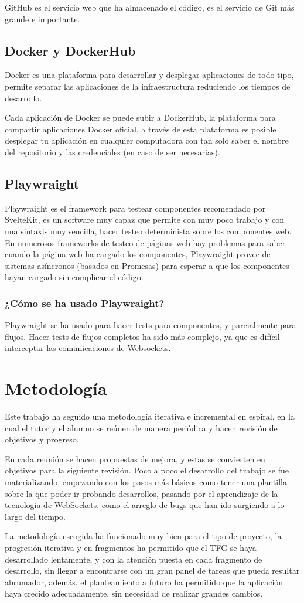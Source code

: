 GitHub es el servicio web que ha almacenado el código, es el servicio de Git más grande e importante.

\subsection{Docker y DockerHub}
Docker es una plataforma para desarrollar y desplegar aplicaciones de todo tipo, permite separar las aplicaciones de la infraestructura reduciendo los tiempos de desarrollo.

Cada aplicación de Docker se puede subir a DockerHub, la plataforma para compartir aplicaciones Docker oficial, a través de esta plataforma es posible desplegar tu aplicación en cualquier computadora con tan solo saber el nombre del repositorio y las credenciales (en caso de ser necesarias).

\subsection{Playwraight}
Playwraight \cite{playwright_docs} es el framework para testear componentes recomendado por SvelteKit, es un software muy capaz que permite con muy poco trabajo y con una sintaxis muy sencilla, hacer testeo determinista sobre los componentes web. En numerosos frameworks de testeo de páginas web hay problemas para saber cuando la página web ha cargado los componentes, Playwraight provee de sistemas asíncronos (basados en Promesas) para esperar a que los componentes hayan cargado sin complicar el código.

\subsubsection{¿Cómo se ha usado Playwraight?}
Playwraight se ha usado para hacer tests para componentes, y parcialmente para flujos. Hacer tests de flujos completos ha sido más complejo, ya que es difícil interceptar las comunicaciones de Websockets.

\section{Metodología}
Este trabajo ha seguido una metodología iterativa e incremental en espiral, en la cual el tutor y el alumno se reúnen de manera periódica y hacen revisión de objetivos y progreso.

En cada reunión se hacen propuestas de mejora, y estas se convierten en objetivos para la siguiente revisión. Poco a poco el desarrollo del trabajo se fue materializando, empezando con los pasos más básicos como tener una plantilla sobre la que poder ir probando desarrollos, pasando por el aprendizaje de la tecnología de WebSockets, como el arreglo de bugs que han ido surgiendo a lo largo del tiempo.

La metodología escogida ha funcionado muy bien para el tipo de proyecto, la progresión iterativa y en fragmentos ha permitido que el TFG se haya desarrollado lentamente, y con la atención puesta en cada fragmento de desarrollo, sin llegar a encontrarse con un gran panel de tareas que pueda resultar abrumador, además, el planteamiento a futuro ha permitido que la aplicación haya crecido adecuadamente, sin necesidad de realizar grandes cambios.
